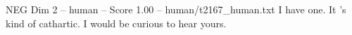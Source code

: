 \begin{textsample}{NEG Dim 2 – human – Score 1.00 – human/t2167\_human.txt}  \label{ex:f2_neg_025}
I have one.
It 's kind of cathartic.
I would be curious to hear yours.

\end{textsample}
